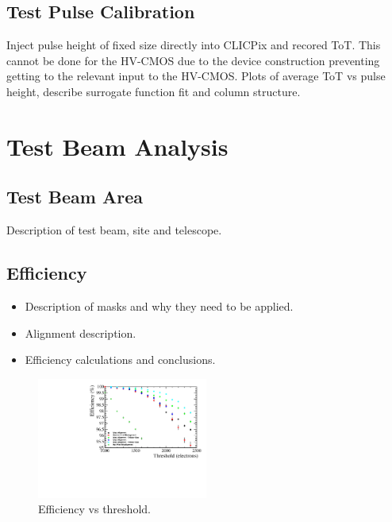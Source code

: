 \subsection{Test Pulse Calibration}
Inject pulse height of fixed size directly into CLICPix and recored ToT.  This cannot be done for the HV-CMOS due to the device construction preventing getting to the relevant input to the HV-CMOS.  Plots of average ToT vs pulse height, describe surrogate function fit and column structure.  

\section{Test Beam Analysis}
\subsection{Test Beam Area}
Description of test beam, site and telescope.

\subsection{Efficiency}

\begin{itemize}
\item Description of masks and why they need to be applied.
\item Alignment description.
\item Efficiency calculations and conclusions. 
\end{itemize}

\begin{figure}
\centering
\includegraphics[width=0.5\textwidth]{CLICdpVertex/Plots/ZoomedEfficiency.pdf}
\caption[Efficiency vs threshold.]{Efficiency vs threshold.}
\label{fig:efficiency}
\end{figure}




  
